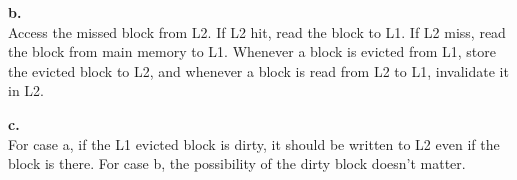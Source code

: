 \documentclass{article}
\begin{document}
\noindent \textbf{b.}\\
\indent Access the missed block from L2. If L2 hit, read the block to L1. If L2 miss, read the block from main memory to L1. Whenever a block is evicted from L1, store the evicted block to L2, and whenever a block is read from L2 to L1, invalidate it in L2.

\noindent \textbf{c.}\\
\indent For case a, if the L1 evicted block is dirty, it should be written to L2 even if the block is there. For case b, the possibility of the dirty block doesn't matter.
\end{document}
